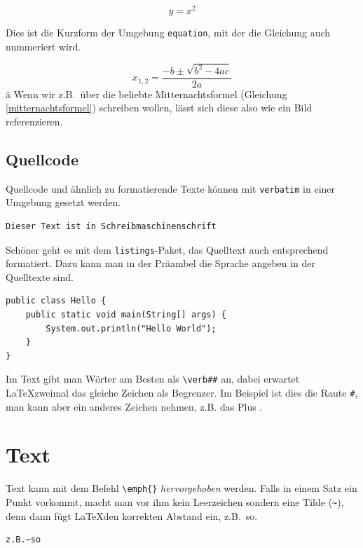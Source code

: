 \[y = x^2 \]

Dies ist die Kurzform der Umgebung \verb|equation|, mit der die Gleichung auch nummeriert wird. 

\begin{equation}
x_{1,2} = \frac{-b\pm\sqrt{b^2-4ac}}{2a}
\label{mitternachtsformel}
\end{equation}ä
Wenn wir z.B.~über die beliebte Mitternachtsformel (Gleichung \ref{mitternachtsformel}) schreiben wollen, lässt sich diese also wie ein Bild referenzieren.



\subsection{Quellcode}

Quellcode und ähnlich zu formatierende Texte können mit \verb|verbatim| in einer Umgebung gesetzt werden.

\begin{verbatim}
Dieser Text ist in Schreibmaschinenschrift
\end{verbatim}

Schöner geht es mit dem \verb|listings|-Paket, das Quelltext auch entsprechend formatiert. Dazu kann man in der Präambel die Sprache angeben in der Quelltexte sind.

\begin{lstlisting}
public class Hello {
    public static void main(String[] args) {
        System.out.println("Hello World");
    }
}
\end{lstlisting}

Im Text gibt man Wörter am Besten als \verb|\verb##| an, dabei erwartet \LaTeX zweimal das gleiche Zeichen als Begrenzer. Im Beispiel ist dies die Raute \verb|#|, man kann aber ein anderes Zeichen nehmen, z.B. das Plus .



\section{Text}

Text kann mit dem Befehl \verb|\emph{}| \emph{hervorgehoben} werden. Falls in einem Satz ein Punkt vorkommt, macht man vor ihm kein Leerzeichen sondern eine Tilde (\verb|~|), denn dann fügt \LaTeX den korrekten Abstand ein, z.B.~so.

\begin{verbatim}
z.B.~so
\end{verbatim}

